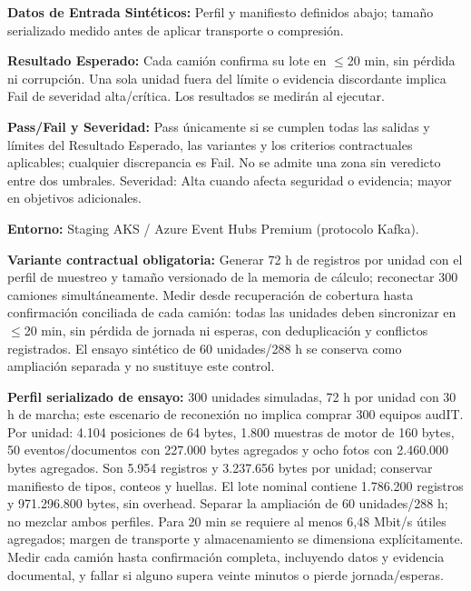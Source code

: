 \par\noindent\textbf{Datos de Entrada Sintéticos:} Perfil y manifiesto definidos abajo; tamaño serializado medido antes de aplicar transporte o compresión.\par
\par\noindent\textbf{Resultado Esperado:} Cada camión confirma su lote en \(\le\)20 min, sin pérdida ni corrupción. Una sola unidad fuera del límite o evidencia discordante implica Fail de severidad alta/crítica. Los resultados se medirán al ejecutar.\par
\par\noindent\textbf{Pass/Fail y Severidad:} Pass únicamente si se cumplen todas las salidas y límites del Resultado Esperado, las variantes y los criterios contractuales aplicables; cualquier discrepancia es Fail. No se admite una zona sin veredicto entre dos umbrales. Severidad: Alta cuando afecta seguridad o evidencia; mayor en objetivos adicionales.\par
\par\noindent\textbf{Entorno:} Staging AKS / Azure Event Hubs Premium (protocolo Kafka).\par

\par\noindent\textbf{Variante contractual obligatoria:} Generar 72 h de registros por unidad con el perfil de muestreo y tamaño versionado de la memoria de cálculo; reconectar 300 camiones simultáneamente. Medir desde recuperación de cobertura hasta confirmación conciliada de cada camión: todas las unidades deben sincronizar en \(\le\)20 min, sin pérdida de jornada ni esperas, con deduplicación y conflictos registrados. El ensayo sintético de 60 unidades/288 h se conserva como ampliación separada y no sustituye este control.\par

\par\noindent\textbf{Perfil serializado de ensayo:} 300 unidades simuladas, 72 h por unidad con 30 h de marcha; este escenario de reconexión no implica comprar 300 equipos audIT. Por unidad: 4.104 posiciones de 64 bytes, 1.800 muestras de motor de 160 bytes, 50 eventos/documentos con 227.000 bytes agregados y ocho fotos con 2.460.000 bytes agregados. Son 5.954 registros y 3.237.656 bytes por unidad; conservar manifiesto de tipos, conteos y huellas. El lote nominal contiene 1.786.200 registros y 971.296.800 bytes, sin overhead. Separar la ampliación de 60 unidades/288 h; no mezclar ambos perfiles. Para 20 min se requiere al menos 6,48 Mbit/s útiles agregados; margen de transporte y almacenamiento se dimensiona explícitamente. Medir cada camión hasta confirmación completa, incluyendo datos y evidencia documental, y fallar si alguno supera veinte minutos o pierde jornada/esperas.\par

